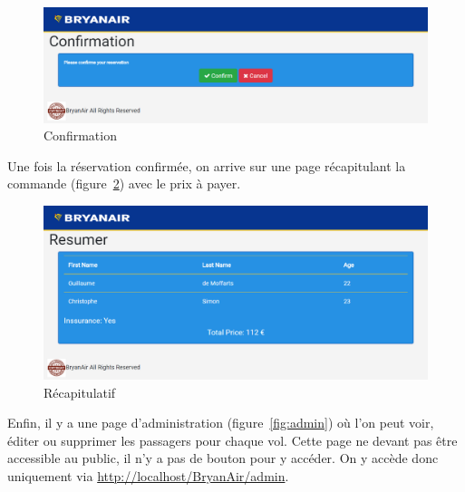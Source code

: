 \documentclass[12pt,a4paper]{article}
\begin{document}
		\begin{figure}
      \includegraphics[width=\textwidth]{Confirmation.png}
			\caption{Confirmation}
			\label{fig:conf}
		\end{figure}
		Une fois la réservation confirmée, on arrive sur une page récapitulant la commande (figure~\ref{fig:recap}) avec le prix à payer.
		\begin{figure}
      \includegraphics[width=\textwidth]{Resumer.png}
			\caption{Récapitulatif}
			\label{fig:recap}
		\end{figure}

		Enfin, il y a une page d'administration (figure~\ref{fig:admin}) où l'on peut voir, éditer ou supprimer les passagers pour chaque vol. Cette page ne devant pas être accessible au public, il n'y a pas de bouton pour y accéder. On y accède donc uniquement via \url{http://localhost/BryanAir/admin}.
\end{document}
